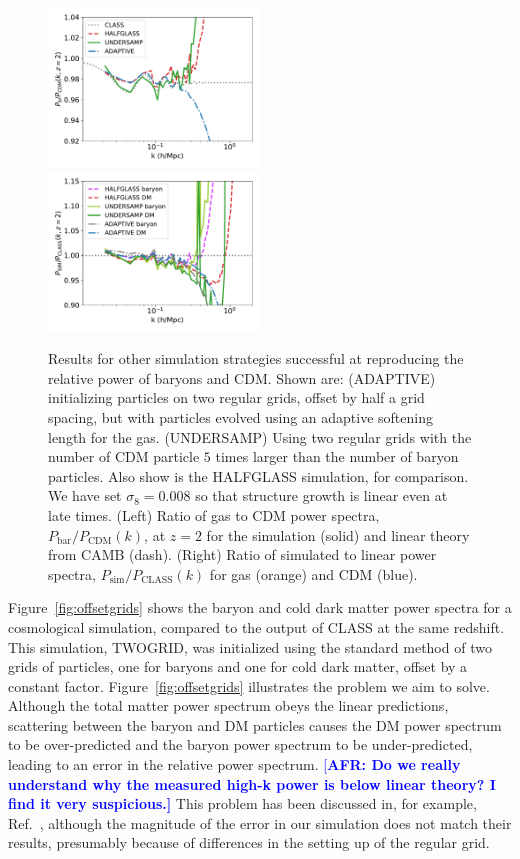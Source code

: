 \documentclass[a4paper,11pt]{article}
\newcommand{\AFR}[1]{\textcolor{blue}{[\bf AFR: #1]} }
\begin{document}
\begin{figure}
\includegraphics[width=0.5\textwidth]{plots/oversample_2_relpower.pdf}
  \includegraphics[width=0.5\textwidth]{plots/oversample_2_class.pdf}
\caption{Results for other simulation strategies successful at reproducing the relative power of baryons and CDM. Shown are: (ADAPTIVE) initializing particles on two regular grids, offset by half a grid spacing, but with particles evolved using an adaptive softening length for the gas. (UNDERSAMP) Using two regular grids with the number of CDM particle $5$ times larger than the number of baryon particles. Also show is the HALFGLASS simulation, for comparison. We have set $\sigma_8 = 0.008$ so that structure growth is linear even at late times. (Left) Ratio of gas to CDM power spectra, $P_\mathrm{bar}/P_\mathrm{CDM}(k)$, at $z=2$ for the simulation (solid) and linear theory from CAMB (dash). (Right) Ratio of simulated to linear power spectra, $P_\mathrm{sim}/P_\mathrm{CLASS}(k)$ for gas (orange) and CDM (blue).}
  \label{fig:adaptive}
\end{figure}

Figure~\ref{fig:offsetgrids} shows the baryon and cold dark matter power spectra for a cosmological simulation, compared to the output of CLASS at the same redshift. This simulation, TWOGRID, was initialized using the standard method of two grids of particles, one for baryons and one for cold dark matter, offset by a constant factor. Figure~\ref{fig:offsetgrids} illustrates the problem we aim to solve. Although the total matter power spectrum obeys the linear predictions, scattering between the baryon and DM particles causes the DM power spectrum to be over-predicted and the baryon power spectrum to be under-predicted, leading to an error in the relative power spectrum. 
\AFR{Do we really understand why the measured high-k power is below linear theory? I find it very suspicious.}
This problem has been discussed in, for example, Ref.~\cite{Angulo:2013}, although the magnitude of the error in our simulation does not match their results, presumably because of differences in the setting up of the regular grid.
\end{document}
